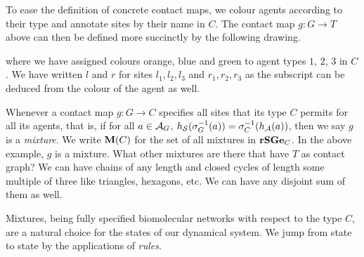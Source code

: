 To ease the definition of concrete contact maps,
we colour agents according to their type
and annotate sites by their name in $C$.
The contact map $g: G \to T$ above can then be defined
more succinctly by the following drawing.
\vspace{.3cm}
\begin{center}
\end{center}
where we have assigned colours orange, blue and green to
agent types $1$, $2$, $3$ in $C$.
We have written $l$ and $r$ for sites $l_1,l_2,l_3$ and $r_1,r_2,r_3$
as the subscript can be deduced from the colour of the agent as well.

Whenever a contact map $g: G \to C$ specifies all sites
that its type $C$ permits for all its agents, that is,
if for all $a \in \mathcal{A}_G$,
$h_{\mathcal{S}}(\sigma_G^{-1}(a)) = \sigma_C^{-1}(h_{\mathcal{A}}(a))$,
then we say $g$ is a \emph{mixture}.
We write $\mathbf{M}(C)$ for the set of all mixtures in $\mathbf{rSGe}_C$.
In the above example, $g$ is a mixture.
What other mixtures are there that have $T$ as contact graph?
We can have chains of any length and closed cycles
of length some multiple of three like triangles, hexagons, etc.
We can have any disjoint sum of them as well.

Mixtures, being fully specified biomolecular networks
with respect to the type $C$,
are a natural choice for the states of our dynamical system.
We jump from state to state by the applications of \emph{rules}.

